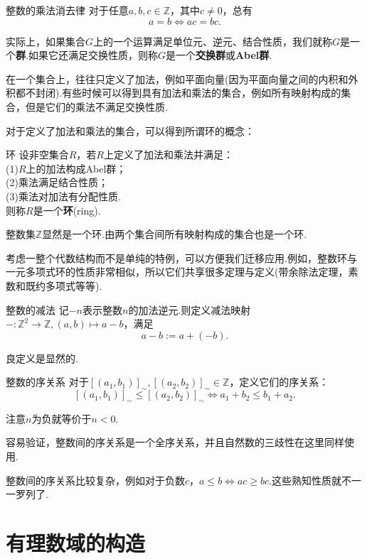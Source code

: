 \documentclass[lang=cn, zihao=5]{elegantbook}
\newcommand{\Z}{\mathbb{Z}}
\begin{document}
\begin{corollary}{整数的乘法消去律}
	对于任意$a,b,c \in \Z$，其中$c \neq 0$，总有$$a=b \Leftrightarrow ac=bc.$$
\end{corollary}

实际上，如果集合$G$上的一个运算满足单位元、逆元、结合性质，我们就称$G$是一个\textbf{群}.如果它还满足交换性质，则称$G$是一个\textbf{交换群}或\textbf{Abel群}.

在一个集合上，往往只定义了加法，例如平面向量(因为平面向量之间的内积和外积都不封闭).有些时候可以得到具有加法和乘法的集合，例如所有映射构成的集合，但是它们的乘法不满足交换性质.

对于定义了加法和乘法的集合，可以得到所谓环的概念：

\begin{axiom}{环}
	设非空集合$R$，若$R$上定义了加法和乘法并满足： \\
	(1)$R$上的加法构成Abel群； \\
	(2)乘法满足结合性质； \\
	(3)乘法对加法有分配性质. \\
	则称$R$是一个\textbf{环}(ring).
\end{axiom}

整数集$\Z$显然是一个环.由两个集合间所有映射构成的集合也是一个环.

考虑一整个代数结构而不是单纯的特例，可以方便我们迁移应用.例如，整数环与一元多项式环的性质非常相似，所以它们共享很多定理与定义(带余除法定理，素数和既约多项式等等).

\begin{definition}{整数的减法}
	记$-n$表示整数$n$的加法逆元.则定义减法映射$-:\Z ^2 \to \Z ,(a,b) \mapsto a-b$，满足$$a-b:=a+(-b).$$
\end{definition}

良定义是显然的.

\begin{definition}{整数的序关系}
	对于$[(a_1,b_1)]_{\sim},[(a_2,b_2)]_{\sim} \in \Z$，定义它们的序关系：$$[(a_1,b_1)]_{\sim} \leq [(a_2,b_2)]_{\sim} \Leftrightarrow a_1+b_2 \leq b_1+a_2.$$
\end{definition}

注意$n$为负就等价于$n<0$.

容易验证，整数间的序关系是一个全序关系，并且自然数的三歧性在这里同样使用.

整数间的序关系比较复杂，例如对于负数$c$，$a \leq b \Leftrightarrow ac \geq bc$.这些熟知性质就不一一罗列了.

\section{有理数域的构造}
\end{document}

